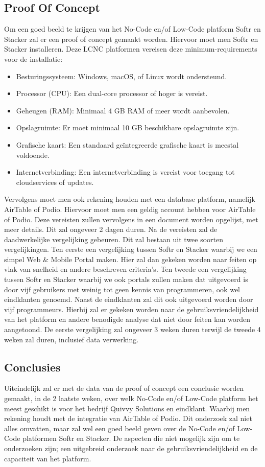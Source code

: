 \subsection*{Proof Of Concept}
\label{sub:proof-of-concept}
Om een goed beeld te krijgen van het No-Code en/of Low-Code platform Softr en Stacker zal er een proof of concept gemaakt worden.
Hiervoor moet men Softr en Stacker installeren. 
Deze LCNC platformen vereisen deze minimum-requirements voor de installatie:
\begin{itemize}
  \item Besturingssysteem: Windows, macOS, of Linux wordt ondersteund.
  \item Processor (CPU): Een dual-core processor of hoger is vereist.
  \item Geheugen (RAM): Minimaal 4 GB RAM of meer wordt aanbevolen.
  \item Opslagruimte: Er moet minimaal 10 GB beschikbare opslagruimte zijn.
  \item Grafische kaart: Een standaard geïntegreerde grafische kaart is meestal voldoende.
  \item Internetverbinding: Een internetverbinding is vereist voor toegang tot cloudservices of updates. 
\end{itemize}
Vervolgens moet men ook rekening houden met een database platform, namelijk AirTable of Podio.
Hiervoor moet men een geldig account hebben voor AirTable of Podio. Deze vereisten zullen vervolgens in een 
document worden opgelijst, met meer details. Dit zal ongeveer 2 dagen duren.
Na de vereisten zal de daadwerkelijke vergelijking gebeuren. Dit zal bestaan uit twee soorten vergelijkingen. Ten eerste
een vergelijking tussen Softr en Stacker waarbij we een simpel Web \& Mobile Portal maken. Hier zal dan gekeken worden naar feiten op vlak van snelheid en andere beschreven criteria's.
Ten tweede een vergelijking tussen Softr en Stacker waarbij we ook portals zullen maken dat uitgevoerd is door vijf gebruikers met weinig tot geen kennis van programmeren, ook wel eindklanten genoemd.
Naast de eindklanten zal dit ook uitgevoerd worden door vijf programmeurs. Hierbij zal er gekeken worden naar de gebruiksvriendelijkheid van het platform en andere benodigde analyse dat niet door feiten kan worden aangetoond.
De eerste vergelijking zal ongeveer 3 weken duren terwijl de tweede 4 weken zal duren, inclusief data verwerking.

\subsection*{Conclusies}
\label{sub:conclusies}
Uiteindelijk zal er met de data van de proof of concept een conclusie worden gemaakt, in de 2 laatste weken, over welk No-Code en/of Low-Code platform het meest geschikt is voor het bedrijf Quivvy Solutions en eindklant. 
Waarbij men rekening houdt met de integratie van AirTable of Podio. Dit onderzoek zal niet alles omvatten, maar zal wel een goed beeld geven over de No-Code en/of Low-Code platformen Softr en Stacker.
De aspecten die niet mogelijk zijn om te onderzoeken zijn; een uitgebreid onderzoek naar de gebruiksvriendelijkheid en de capaciteit van het platform.


